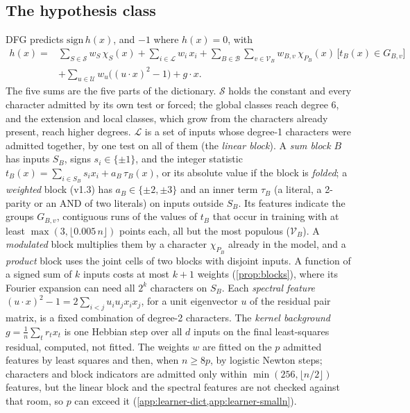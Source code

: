 \subsection{The hypothesis class}\label{sec:hypothesis}

DFG predicts $\mathrm{sign}\,h(x)$, and $-1$ where $h(x)=0$, with
\begin{equation}\label{eq:dfgclass}
\begin{split}
h(x)={}&\sum_{S\in\mathcal S}w_S\,\chi_S(x)+\sum_{i\in\mathcal L}w_i\,x_i+\sum_{B\in\mathcal B}\sum_{v\in\mathcal V_B}w_{B,v}\,\chi_{P_B}(x)\,\bigl[t_B(x)\in G_{B,v}\bigr]\\
&+\sum_{u\in\mathcal U}w_u\bigl((u\cdot x)^2-1\bigr)+g\cdot x .
\end{split}
\end{equation}
The five sums are the five parts of the dictionary. $\mathcal S$ holds the constant and every character admitted by its own test or forced; the global classes reach degree 6, and the extension and local classes, which grow from the characters already present, reach higher degrees. $\mathcal L$ is a set of inputs whose degree-1 characters were admitted together, by one test on all of them (the \emph{linear block}). A \emph{sum block} $B$ has inputs $S_B$, signs $s_i\in\{\pm1\}$, and the integer statistic $t_B(x)=\sum_{i\in S_B}s_ix_i+a_B\,\tau_B(x)$, or its absolute value if the block is \emph{folded}; a \emph{weighted} block (v1.3) has $a_B\in\{\pm2,\pm3\}$ and an inner term $\tau_B$ (a literal, a 2-parity or an AND of two literals) on inputs outside $S_B$. Its features indicate the groups $G_{B,v}$, contiguous runs of the values of $t_B$ that occur in training with at least $\max(3,\lfloor0.005\,n\rfloor)$ points each, all but the most populous ($\mathcal V_B$). A \emph{modulated} block multiplies them by a character $\chi_{P_B}$ already in the model, and a \emph{product} block uses the joint cells of two blocks with disjoint inputs. A function of a signed sum of $k$ inputs costs at most $k+1$ weights (\cref{prop:blocks}), where its Fourier expansion can need all $2^k$ characters on $S_B$. Each \emph{spectral feature} $(u\cdot x)^2-1=2\sum_{i<j}u_iu_jx_ix_j$, for a unit eigenvector $u$ of the residual pair matrix, is a fixed combination of degree-2 characters. The \emph{kernel background} $g=\frac1n\sum_tr_tx_t$ is one Hebbian step over all $d$ inputs on the final least-squares residual, computed, not fitted. The weights $w$ are fitted on the $p$ admitted features by least squares and then, when $n\ge8p$, by logistic Newton steps; characters and block indicators are admitted only within $\min(256,\lfloor n/2\rfloor)$ features, but the linear block and the spectral features are not checked against that room, so $p$ can exceed it (\cref{app:learner-dict,app:learner-smalln}).

